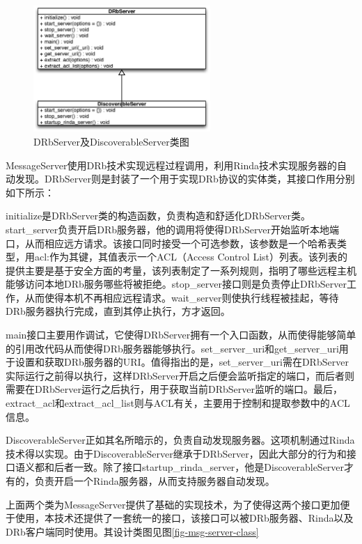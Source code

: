 \begin{figure}[h]
\centering
\includegraphics[width=0.6\textwidth]{images/detail/drbserver_class.eps}
\caption{DRbServer及DiscoverableServer类图}
\label{fig-drb-class}
\end{figure}

MessageServer使用DRb技术实现远程过程调用，利用Rinda技术实现服务器的自动发现。DRbServer则是封装了一个用于实现DRb协议的实体类，其接口作用分别如下所示：

initialize是DRbServer类的构造函数，负责构造和舒适化DRbServer类。start\_server负责开启DRb服务器，他的调用将使得DRbServer开始监听本地端口，从而相应远方请求。该接口同时接受一个可选参数，该参数是一个哈希表类型，用acl:作为其键，其值表示一个ACL（Access Control List）列表。该列表的提供主要是基于安全方面的考量，该列表制定了一系列规则，指明了哪些远程主机能够访问本地DRb服务哪些将被拒绝。stop\_server接口则是负责停止DRbServer工作，从而使得本机不再相应远程请求。wait\_server则使执行线程被挂起，等待DRb服务器执行完成，直到其停止执行，方才返回。

main接口主要用作调试，它使得DRbServer拥有一个入口函数，从而使得能够简单的引用改代码从而使得DRb服务器能够执行。set\_server\_uri和get\_server\_uri用于设置和获取DRb服务器的URI。值得指出的是，set\_server\_uri需在DRbServer实际运行之前得以执行，这样DRbServer开启之后便会监听指定的端口，而后者则需要在DRbServer运行之后执行，用于获取当前DRbServer监听的端口。最后，extract\_acl和extract\_acl\_list则与ACL有关，主要用于控制和提取参数中的ACL信息。

DiscoverableServer正如其名所暗示的，负责自动发现服务器。这项机制通过Rinda技术得以实现。由于DiscoverableServer继承于DRbServer，因此大部分的行为和接口语义都和后者一致。除了接口startup_rinda_server，他是DiscoverableServer才有的，负责开启一个Rinda服务器，从而支持服务器自动发现。

上面两个类为MessageServer提供了基础的实现技术，为了使得这两个接口更加便于使用，本技术还提供了一套统一的接口，该接口可以被DRb服务器、Rinda以及DRb客户端同时使用。其设计类图见图\ref{fig-msg-server-class}


